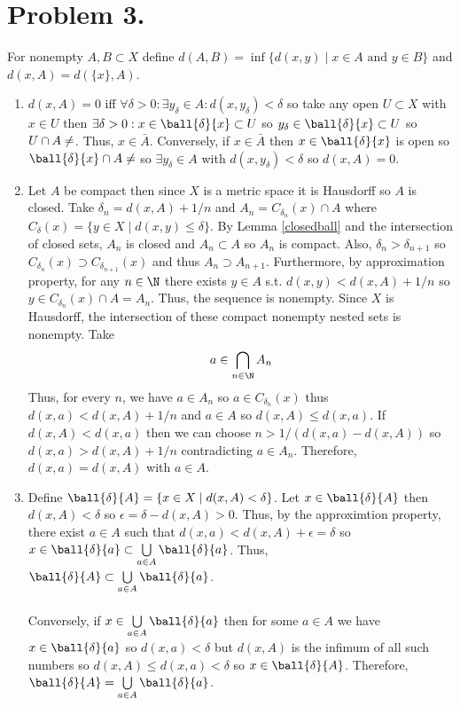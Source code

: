 \documentclass[12pt]{extarticle}
\begin{document}
\section*{Problem 3.}
For nonempty $A, B \subset X$ define $d(A, B) = \inf\{d(x, y) \mid x \in A \text{ and } y \in B \}$ and $d(x, A) = d(\{x \}, A)$.  
\begin{enumerate}
\item $d(x, A) = 0$ iff $\forall \delta > 0 : \exists y_\delta \in A : d(x, y_\delta) < \delta$ so take any open $U \subset X$ with $x \in U$ then $\exists \delta > 0 : x \in \ball{\delta}{x} \subset U$ so $y_\delta \in \ball{\delta}{x} \subset U$ so $U \cap A \neq \empty$. Thus, $x \in \bar{A}$. Conversely, if $x \in \bar{A}$ then $x \in \ball{\delta}{x}$ is open so $\ball{\delta}{x} \cap A \neq \empty$ so $\exists y_\delta \in A$ with $d(x, y_\delta) < \delta$ so $d(x, A) = 0$.  

\item Let $A$ be compact then since $X$ is a metric space it is Hausdorff so $A$ is closed. Take $\delta_n = d(x, A) + 1/n$ and $A_n = C_{\delta_n} (x) \cap A$ where $C_\delta(x) = \{y \in X \mid d(x, y) \le \delta\}$. By Lemma \ref{closedball} and the intersection of closed sets, $A_n$ is closed and $A_n \subset A$ so $A_n$ is compact. Also, $\delta_n > \delta_{n+1}$ so $C_{\delta_n}(x) \supset C_{\delta_{n+1}}(x)$ and thus $A_{n} \supset A_{n+1}$. Furthermore, by approximation property, for any $n \in \N$ there exists $y \in A$ s.t. $d(x, y) < d(x, A) + 1/n$ so $y \in C_{\delta_n}(x) \cap A = A_n$. Thus, the sequence is nonempty. Since $X$ is Hausdorff, the intersection of these compact nonempty nested sets is nonempty. Take \[a \in \bigcap_{n \in \N} A_n\] 
Thus, for every $n$, we have $a \in A_n$ so $a \in C_{\delta_n}(x)$ thus $d(x, a) < d(x, A) + 1/n$ and $a \in A$ so $d(x, A) \le d(x, a)$. If $d(x, A) < d(x, a)$ then we can choose $n > 1/(d(x, a) - d(x, A))$ so $d(x, a) > d(x, A) + 1/n$ contradicting $a \in A_n$. Therefore, $d(x, a) = d(x, A)$ with $a \in A$.    

\item Define $\ball{\delta}{A} = \{ x \in X \mid d(x, A) < \delta\}$. Let $x \in \ball{\delta}{A}$ then $d(x, A) < \delta$ so $\epsilon = \delta - d(x, A) > 0$. Thus, by the approximtion property, there exist $a \in A$ such that $d(x, a) < d(x, A) + \epsilon = \delta$ so $x \in \ball{\delta}{a} \subset \bigcup\limits_{a \in A} \ball{\delta}{a}$. Thus, $\ball{\delta}{A} \subset \bigcup\limits_{a \in A} \ball{\delta}{a}$. \\\\
Conversely, if $x \in \bigcup\limits_{a \in A} \ball{\delta}{a}$ then for some $a \in A$ we have $x \in \ball{\delta}{a}$ so $d(x, a) < \delta$ but $d(x, A)$ is the infimum of all such numbers so $d(x, A) \le d(x, a) < \delta$ so $x \in \ball{\delta}{A}$. Therefore, $\ball{\delta}{A} = \bigcup\limits_{a \in A} \ball{\delta}{a}$.     


\end{enumerate}
\end{document}
